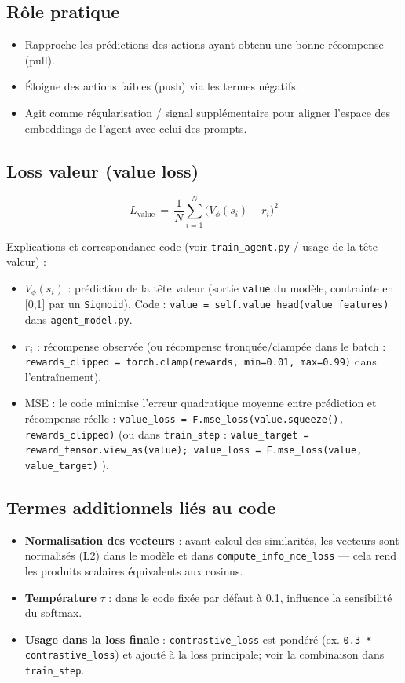 \documentclass[a4paper,11pt]{article}
\begin{document}
\subsection*{Rôle pratique}
\begin{itemize}
  \item Rapproche les prédictions des actions ayant obtenu une bonne récompense (pull). 
  \item Éloigne des actions faibles (push) via les termes négatifs. 
  \item Agit comme régularisation / signal supplémentaire pour aligner l'espace des embeddings de l'agent avec celui des prompts.
\end{itemize}

\subsection*{Loss valeur (value loss)}
\begin{equation}
L_{\text{value}} \,=\, \frac{1}{N}\sum_{i=1}^{N} \big(V_{\phi}(s_i) - r_i\big)^2
\end{equation}

Explications et correspondance code (voir \texttt{train_agent.py} / usage de la tête valeur) :
\begin{itemize}
  \item $V_{\phi}(s_i)$ : prédiction de la tête valeur (sortie \texttt{value} du modèle, contrainte en [0,1] par un \texttt{Sigmoid}). Code : \texttt{value = self.value_head(value_features)} dans \texttt{agent_model.py}. \\ 
  \item $r_i$ : récompense observée (ou récompense tronquée/clampée dans le batch : \texttt{rewards\_clipped = torch.clamp(rewards, min=0.01, max=0.99)} dans l'entraînement). \\ 
  \item MSE : le code minimise l'erreur quadratique moyenne entre prédiction et récompense réelle : \texttt{value\_loss = F.mse\_loss(value.squeeze(), rewards\_clipped)} (ou dans \texttt{train\_step} : \texttt{value\_target = reward\_tensor.view\_as(value); value\_loss = F.mse\_loss(value, value\_target)} ).
\end{itemize}

\subsection*{Termes additionnels liés au code}
\begin{itemize}
  \item \textbf{Normalisation des vecteurs} : avant calcul des similarités, les vecteurs sont normalisés (L2) dans le modèle et dans \texttt{compute\_info\_nce\_loss} — cela rend les produits scalaires équivalents aux cosinus. 
  \item \textbf{Température} $\tau$ : dans le code fixée par défaut à 0.1, influence la sensibilité du softmax. 
  \item \textbf{Usage dans la loss finale} : \texttt{contrastive\_loss} est pondéré (ex. \texttt{0.3 * contrastive\_loss}) et ajouté à la loss principale; voir la combinaison dans \texttt{train\_step}. 
\end{itemize}
\end{document}
